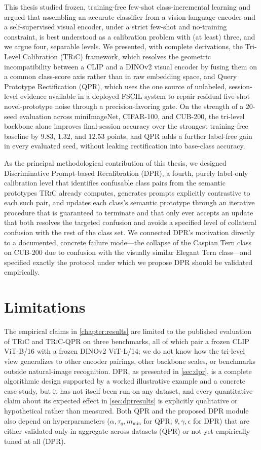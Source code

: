 \documentclass{iutbscthesis}
\begin{document}
This thesis studied frozen, training-free few-shot class-incremental learning and argued that assembling an accurate classifier from a vision-language encoder and a self-supervised visual encoder, under a strict few-shot and no-training constraint, is best understood as a calibration problem with (at least) three, and we argue four, separable levels. We presented, with complete derivations, the Tri-Level Calibration (\textsc{TRiC}) framework, which resolves the geometric incompatibility between a CLIP and a DINOv2 visual encoder by fusing them on a common class-score axis rather than in raw embedding space, and Query Prototype Rectification (QPR), which uses the one source of unlabeled, session-level evidence available in a deployed FSCIL system to repair residual five-shot novel-prototype noise through a precision-favoring gate. On the strength of a 20-seed evaluation across miniImageNet, CIFAR-100, and CUB-200, the tri-level backbone alone improves final-session accuracy over the strongest training-free baseline by $9.83$, $1.32$, and $12.53$ points, and QPR adds a further label-free gain in every evaluated seed, without leaking rectification into base-class accuracy.

As the principal methodological contribution of this thesis, we designed Discriminative Prompt-based Recalibration (DPR), a fourth, purely label-only calibration level that identifies confusable class pairs from the semantic prototypes \textsc{TRiC} already computes, generates prompts explicitly contrastive to each such pair, and updates each class's semantic prototype through an iterative procedure that is guaranteed to terminate and that only ever accepts an update that both resolves the targeted confusion and avoids a specified level of collateral confusion with the rest of the class set. We connected DPR's motivation directly to a documented, concrete failure mode---the collapse of the Caspian Tern class on CUB-200 due to confusion with the visually similar Elegant Tern class---and specified exactly the protocol under which we propose DPR should be validated empirically.

\section{Limitations}

The empirical claims in \autoref{chapter:results} are limited to the published evaluation of \textsc{TRiC} and \textsc{TRiC}-QPR on three benchmarks, all of which pair a frozen CLIP ViT-B/16 with a frozen DINOv2 ViT-L/14; we do not know how the tri-level view generalizes to other encoder pairings, other backbone scales, or benchmarks outside natural-image recognition. DPR, as presented in \autoref{sec:dpr}, is a complete algorithmic design supported by a worked illustrative example and a concrete case study, but it has not itself been run on any dataset, and every quantitative claim about its expected effect in \autoref{sec:dprresults} is explicitly qualitative or hypothetical rather than measured. Both QPR and the proposed DPR module also depend on hyperparameters ($\alpha, \tau_q, m_{\min}$ for QPR; $\theta, \gamma, \epsilon$ for DPR) that are either validated only in aggregate across datasets (QPR) or not yet empirically tuned at all (DPR).
\end{document}
